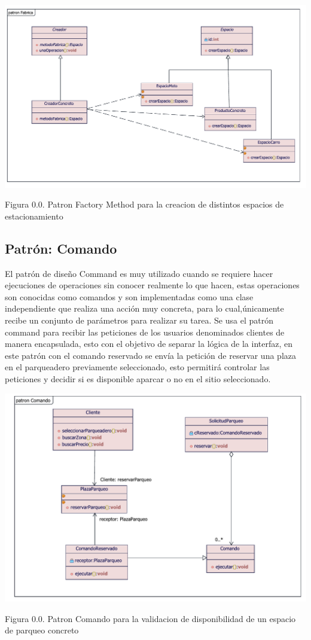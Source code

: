 \begin{center}
	{\includegraphics[width=1.20\linewidth]{imgs/DiagramaClase/FactoryMethod}}
\end{center}
\begin{center}
	Figura 0.0. Patron Factory Method para la creacion de distintos espacios de estacionamiento
\end{center}
\newpage

\subsection{Patrón: Comando}
\begin{flushleft}
	El patrón de diseño Command es muy utilizado cuando se requiere hacer ejecuciones de operaciones sin conocer realmente lo que hacen, estas operaciones son conocidas como comandos y son implementadas como una clase independiente que realiza una acción muy concreta, para lo cual,únicamente recibe un conjunto de parámetros para realizar su tarea.
	Se usa el patrón command para recibir las peticiones de los usuarios denominados clientes de manera encapsulada, esto con el objetivo de separar la lógica de la interfaz, en este patrón con el comando reservado se envía la petición de reservar una plaza en el parqueadero previamente seleccionado, esto permitirá controlar las peticiones y decidir si es disponible aparcar o no en el sitio seleccionado.
	\\
	
\end{flushleft}

\begin{center}
	{\includegraphics[width=1.20\linewidth]{imgs/DiagramaClase/command}}
\end{center}
\begin{center}
	Figura 0.0. Patron Comando para la validacion de disponibilidad de un espacio de parqueo concreto
\end{center}
\newpage
